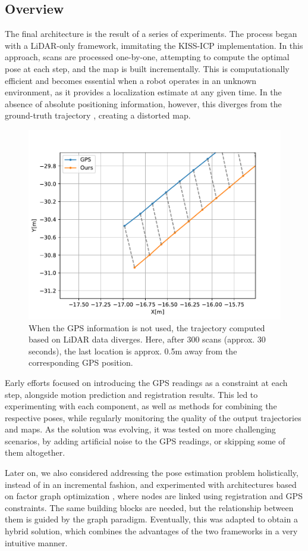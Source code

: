 \subsection{Overview}

The final architecture is the result of a series of experiments. The process began with a LiDAR-only framework, immitating the KISS-ICP \cite{vizzo2023ral} implementation.  In this approach, scans are processed one-by-one, attempting to compute the optimal pose at each step, and the map is built incrementally. This is computationally efficient and becomes essential when a robot operates in an unknown environment, as it provides a localization estimate at any given time. In the absence of absolute positioning information, however, this diverges from the ground-truth trajectory , creating a distorted map.

\begin{figure}[h]
	\centering
	\includegraphics[width=0.5\linewidth]{images/deviation_30s.pdf}
	\caption[Trajectory deviation from GPS]{When the GPS information is not used, the trajectory computed based on LiDAR data diverges. Here, after 300 scans (approx. 30 seconds), the last location is approx. 0.5m away from the corresponding GPS position.}
	\label{fig:deviation-no-gps}
\end{figure}

Early efforts focused on introducing the GPS readings as a constraint at each step, alongside motion prediction and registration results. This led to experimenting with each component, as well as methods for combining the respective poses, while regularly monitoring the quality of the output trajectories and maps. As the solution was evolving, it was tested on more challenging scenarios, by adding artificial noise to the GPS readings, or skipping some of them altogether.

Later on, we also considered addressing the pose estimation problem holistically, instead of in an incremental fashion, and experimented with architectures based on factor graph optimization \cite{dellaert2017factor}, where nodes are linked using registration and GPS constraints. The same building blocks are needed, but the relationship between them is guided by the graph paradigm. Eventually, this was adapted to obtain a hybrid solution, which combines the advantages of the two frameworks in a very intuitive manner.


